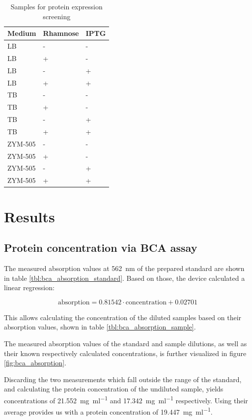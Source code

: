 \documentclass[a4paper]{scrreprt}
\begin{document}
\begin{table}
	\centering
	\begin{tabu}{lll}
		\toprule
		Medium & Rhamnose & IPTG \\
		\midrule
		LB & - & - \\
		LB & + & - \\
		LB & - & + \\
		LB & + & + \\

		TB & - & - \\
		TB & + & - \\
		TB & - & + \\
		TB & + & + \\

		ZYM-505 & - & - \\
		ZYM-505 & + & - \\
		ZYM-505 & - & + \\
		ZYM-505 & + & + \\
		\bottomrule
	\end{tabu}
	\caption{Samples for protein expression screening}
	\label{tbl:expression_samples}
\end{table}

\chapter{Results}

\section{Protein concentration via BCA assay}

\label{sec:protein_concentration}

The measured absorption values at \SI{562}{\nm} of the prepared standard are
shown in table \ref{tbl:bca_absorption_standard}. Based on those, the device
calculated a linear regression:

\[
	\text{absorption} = 0.81542 \cdot \text{concentration} + 0.02701
\]

This allows calculating the concentration of the diluted samples based on their
absorption values, shown in table \ref{tbl:bca_absorption_sample}.

The measured absorption values of the standard and sample dilutions, as well as
their known respectively calculated concentrations, is further visualized in
figure \ref{fig:bca_absorption}.

Discarding the two measurements which fall outside the range of the standard,
and calculating the protein concentration of the undiluted sample, yields
concentrations of \SI{21.552}{\mg\per\ml} and \SI{17.342}{\mg\per\ml}
respectively. Using their average provides us with a protein concentration of
\SI{19.447}{\mg\per\ml}.
\end{document}
